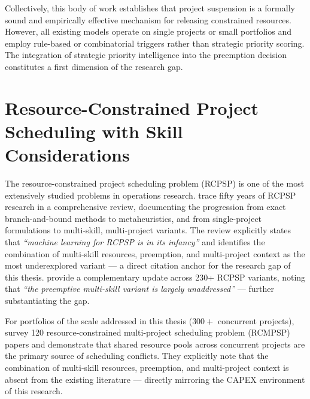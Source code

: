 Collectively, this body of work establishes that project suspension is a formally sound and
empirically effective mechanism for releasing constrained resources. However, all existing
models operate on single projects or small portfolios and employ rule-based or combinatorial
triggers rather than strategic priority scoring. The integration of strategic priority
intelligence into the preemption decision constitutes a first dimension of the research gap.

\section{Resource-Constrained Project Scheduling with Skill Considerations}
\label{sec:lit_rcpsp}

The resource-constrained project scheduling problem (RCPSP) is one of the most extensively
studied problems in operations research. \textcite{artigues2025fifty} trace fifty years of RCPSP
research in a comprehensive review, documenting the progression from exact branch-and-bound
methods to metaheuristics, and from single-project formulations to multi-skill, multi-project
variants. The review explicitly states that \textit{``machine learning for RCPSP is in its
infancy''} and identifies the combination of multi-skill resources, preemption, and multi-project
context as the most underexplored variant — a direct citation anchor for the research gap of
this thesis. \textcite{hartmann2022updated} provide a complementary update across 230+ RCPSP
variants, noting that \textit{``the preemptive multi-skill variant is largely unaddressed''} —
further substantiating the gap.

For portfolios of the scale addressed in this thesis ($300+$ concurrent projects),
\textcite{gomez2023survey} survey 120 resource-constrained multi-project scheduling problem
(RCMPSP) papers and demonstrate that shared resource pools across concurrent projects are
the primary source of scheduling conflicts. They explicitly note that the combination of
multi-skill resources, preemption, and multi-project context is absent from the existing
literature — directly mirroring the CAPEX environment of this research.

